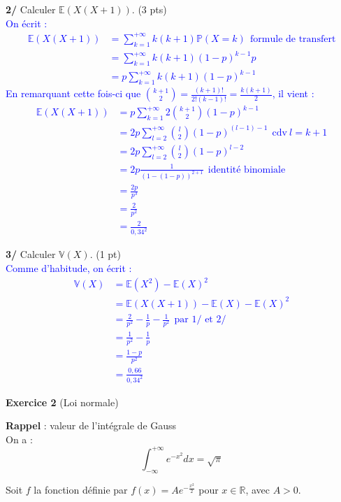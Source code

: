 \documentclass[a4paper,12pt]{article}
\newcommand{\E}{\mathbb{E}}
\newcommand{\prob}{\mathbb{P}}
\begin{document}
\textbf{2/} Calculer $\E (X(X+1))$. (3 pts) \\

\textcolor{blue}{
On écrit :
\begin{align*}
\E (X(X+1)) & = \sum_{k=1}^{+\infty} k (k+1) \prob (X=k) \ \ \text{formule de transfert}  \\
& = \sum_{k=1}^{+\infty} k(k+1) (1-p)^{k-1} p \\
& =  p \sum_{k=1}^{+\infty} k(k+1) (1-p)^{k-1}
\end{align*}
En remarquant cette fois-ci que $\binom{k+1}{2} = \frac{(k+1)!}{2!(k-1)!} = \frac{k(k+1)}{2}$, il vient :
\begin{align*}
\E (X(X+1)) & = p \sum_{k=1}^{+\infty} 2 \binom{k+1}{2} (1-p)^{k-1} \\
& = 2p \sum_{l=2}^{+\infty} \binom{l}{2} (1-p)^{(l-1)-1} \ \ \text{cdv} \ l=k+1 \\
& = 2p \sum_{l=2}^{+\infty} \binom{l}{2} (1-p)^{l-2} \\
& = 2p \frac{1}{(1-(1-p))^{2+1}} \ \ \text{identité binomiale} \\
& = \frac{2p}{p^3} \\
& = \frac{2}{p^2} \\
& \boxed{= \frac{2}{0,34^2}}
\end{align*}
}

\textbf{3/} Calculer $\mathbb{V} (X)$. (1 pt) \\

\textcolor{blue}{
Comme d'habitude, on écrit :
\begin{align*}
\mathbb{V} (X) & = \E (X^2) - \E(X)^2 \\
& = \E(X(X+1)) - \E(X) - \E(X)^2 \\
& = \frac{2}{p^2}-\frac{1}{p} -\frac{1}{p^2} \ \ \text{par 1/ et 2/} \\
& = \frac{1}{p^2} - \frac{1}{p} \\
& = \frac{1-p}{p^2} \\
& \boxed{ = \frac{0,66}{0,34^2}}
\end{align*}
}

\textbf{Exercice 2} (Loi normale) \\

\begin{tcolorbox}[colframe=black, colback=white, sharp corners, width=\textwidth, boxrule=0.5mm]
\textbf{Rappel} : valeur de l'intégrale de Gauss \\
On a :
$$\int_{- \infty}^{+ \infty} e^{-x^2} dx = \sqrt{\pi}$$
\end{tcolorbox}
Soit $f$ la fonction définie par $f(x)=Ae^{-\frac{x^2}{2}}$ pour $x \in \mathbb{R}$, avec $A>0$. \\
\end{document}
